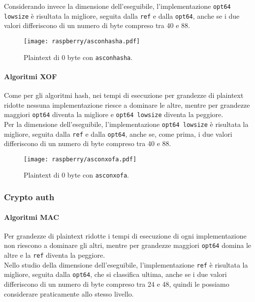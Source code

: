 \noindent Considerando invece la dimensione dell'eseguibile, l'implementazione \texttt{opt64 lowsize} è risultata la migliore, seguita dalla \texttt{ref} e dalla \texttt{opt64}, anche se i due valori differiscono di un numero di byte compreso tra 40 e 88.

\begin{figure}[H]
    \centering
    \texttt{[image: raspberry/asconhasha.pdf]}
    \caption{Plaintext di 0 byte con \texttt{asconhasha}.}
\end{figure}

\paragraph{Algoritmi XOF}

Come per gli algoritmi hash, nei tempi di esecuzione per grandezze di plaintext ridotte nessuna implementazione riesce a dominare le altre, mentre per grandezze maggiori \texttt{opt64} diventa la migliore e \texttt{opt64 lowsize} diventa la peggiore. \\

\noindent Per la dimensione dell'eseguibile, l'implementazione \texttt{opt64 lowsize} è risultata la migliore, seguita dalla \texttt{ref} e dalla \texttt{opt64}, anche se, come prima, i due valori differiscono di un numero di byte compreso tra 40 e 88.

\begin{figure}[H]
    \centering
    \texttt{[image: raspberry/asconxofa.pdf]}
    \caption{Plaintext di 0 byte con \texttt{asconxofa}.}
\end{figure}

\subsubsection{Crypto auth}

\paragraph{Algoritmi MAC}

Per grandezze di plaintext ridotte i tempi di esecuzione di ogni implementazione non riescono a dominare gli altri, mentre per grandezze maggiori \texttt{opt64} domina le altre e la \texttt{ref} diventa la peggiore. \\

\noindent Nello studio della dimensione dell'eseguibile, l'implementazione \texttt{ref} è risultata la migliore, seguita dalla \texttt{opt64}, che si classifica ultima, anche se i due valori differiscono di un numero di byte compreso tra 24 e 48, quindi le possiamo considerare praticamente allo stesso livello.

